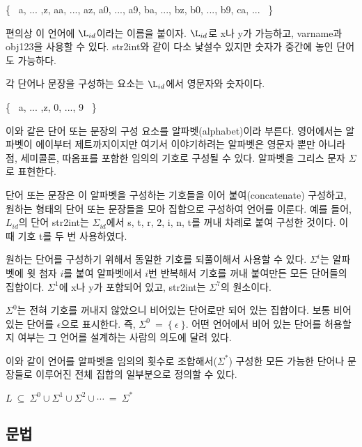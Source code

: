 \documentclass[a4paper]{book}
\begin{document}
\begin{center}
  \{ \ a, ... ,z, aa, ..., az, a0, ..., a9,
       ba, ..., bz, b0, ..., b9, ca, ...
     \ 
  \}
\end{center}

편의상 이 언어에 $\L_{id}$이라는 이름을 붙이자. $\L_{id}$로 x나 y가
가능하고, varname과 obj123을 사용할 수 있다. str2int와 같이 다소
낯설수 있지만 숫자가 중간에 놓인 단어도 가능하다.

각 단어나 문장을 구성하는 요소는 $\L_{id}$에서 영문자와 숫자이다.
\begin{center}
  \{ \ a, ... ,z, 0, ..., 9
     \ 
  \}
\end{center}


이와 같은 단어 또는 문장의 구성 요소를 알파벳(alphabet)이라
부른다. 영어에서는 알파벳이 에이부터 제트까지이지만 여기서
이야기하려는 알파벳은 영문자 뿐만 아니라 점, 세미콜론, 따옴표를 포함한
임의의 기호로 구성될 수 있다. 알파벳을 그리스 문자 $\Sigma$로
표현한다.

단어 또는 문장은 이 알파벳을 구성하는 기호들을 이어 붙여(concatenate)
구성하고, 원하는 형태의 단어 또는 문장들을 모아 집합으로 구성하여
언어를 이룬다. 예를 들어, $L_{id}$의 단어 str2int는 $\Sigma_{id}$에서
s, t, r, 2, i, n, t를 꺼내 차례로 붙여 구성한 것이다. 이때 기호 t를 두
번 사용하였다.

원하는 단어를 구성하기 위해서 동일한 기호를 되풀이해서 사용할 수
있다. $\Sigma^i$는 알파벳에 윗 첨자 $i$를 붙여 알파벳에서 $i$번
반복해서 기호를 꺼내 붙여만든 모든 단어들의 집합이다. $\Sigma^1$에
x나 y가 포함되어 있고, str2int는 $\Sigma^7$의 원소이다.

$\Sigma^0$는 전혀 기호를 꺼내지 않았으니 비어있는 단어로만 되어 있는
집합이다.  보통 비어있는 단어를 $\epsilon$으로 표시한다. 즉, $\Sigma^0
\ = \ \{ \ \epsilon \ \}$. 어떤 언어에서 비어 있는 단어를 허용할지
여부는 그 언어를 설계하는 사람의 의도에 달려 있다.

이와 같이 언어를 알파벳을 임의의 횟수로 조합해서($\Sigma^*$) 구성한
모든 가능한 단어나 문장들로 이루어진 전체 집합의 일부분으로 정의할 수
있다.

\begin{center}
  $L \ \subseteq \ \Sigma^0 \cup \Sigma^1 \cup \Sigma^2 \cup \cdots  \ = \ \Sigma^*$
\end{center}

\subsection{문법}
\label{subsec:grammar}
\end{document}
